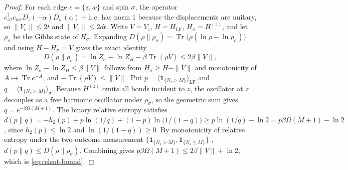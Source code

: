 \documentclass[11pt]{article}
\theoremstyle{definition}
\theoremstyle{remark}
\DeclareMathOperator{\Tr}{Tr}
\newcommand{\LF}{\mathrm{LF}}
\begin{document}
\begin{proof}
For each edge $e=\{z,w\}$ and spin $\sigma$, the operator
$c_{z\sigma}^{\dagger}c_{w\sigma}D_{z}(-\alpha)D_{w}(\alpha)+\mathrm{h.c.}$ has
norm $1$ because the displacements are unitary, so $\|V_{e}\|\le2t$ and
$\|V_{z}\|\le2dt$. Write $V=V_{z}$, $H=H_{\LF}$, $H_{\sigma}=H^{(z)}$, and let
$\rho_{\sigma}$ be the Gibbs state of $H_{\sigma}$. Expanding
$D(\rho\|\rho_{\sigma})=\Tr\bigl(\rho(\ln\rho-\ln\rho_{\sigma})\bigr)$ and using
$H-H_{\sigma}=V$ gives the exact identity
\begin{equation}
D(\rho\|\rho_{\sigma})=\ln Z_{\sigma}-\ln Z_{H}-\beta\Tr(\rho V)\le2\beta\|V\|,
\end{equation}
where $\ln Z_{\sigma}-\ln Z_{H}\le\beta\|V\|$ follows from
$H_{\sigma}\ge H-\|V\|$ and monotonicity of $A\mapsto\Tr e^{-A}$, and $-\Tr(\rho V)\le\|V\|$. Put
$p=\langle\mathbf{1}_{\{N_{z}>M\}}\rangle_{\LF}$ and
$q=\langle\mathbf{1}_{\{N_{z}>M\}}\rangle_{\sigma}$. Because $H^{(z)}$ omits all
bonds incident to $z$, the oscillator at $z$ decouples as a free harmonic
oscillator under $\rho_{\sigma}$, so the geometric sum gives
$q=e^{-\beta\Omega(M+1)}$. The binary relative entropy satisfies
$d(p\|q)=-h_{2}(p)+p\ln(1/q)+(1-p)\ln\bigl(1/(1-q)\bigr)\ge p\ln(1/q)-\ln2
=p\beta\Omega(M+1)-\ln2$, since $h_{2}(p)\le\ln2$ and $\ln(1/(1-q))\ge0$. By
monotonicity of relative entropy under the two-outcome measurement
$\{\mathbf{1}_{\{N_{z}>M\}},\mathbf{1}_{\{N_{z}\le M\}}\}$ \cite{ohya},
$d(p\|q)\le D(\rho\|\rho_{\sigma})$. Combining gives
$p\beta\Omega(M+1)\le2\beta\|V\|+\ln2$, which is \eqref{eq:relent-bound}.
\end{proof}
\end{document}
